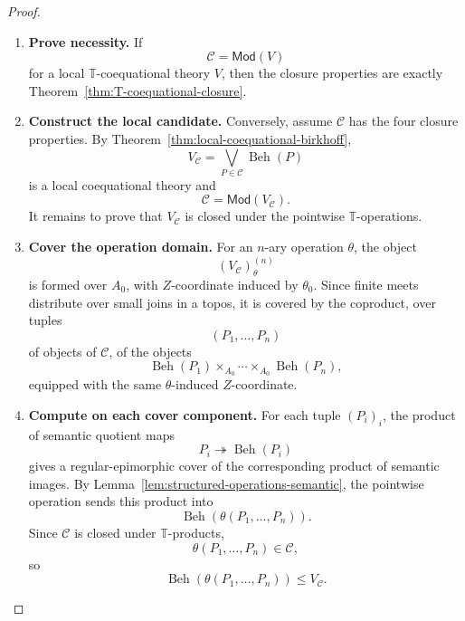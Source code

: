 \begin{proof}
    \leavevmode
    \begin{enumerate}
        \item \textbf{Prove necessity.}
        If
        \[
            \mathcal C=\mathsf{Mod}(V)
        \]
        for a local \(\mathbb T\)-coequational theory \(V\), then the closure
        properties are exactly Theorem~\ref{thm:T-coequational-closure}.

        \item \textbf{Construct the local candidate.}
        Conversely, assume \(\mathcal C\) has the four closure properties. By
        Theorem~\ref{thm:local-coequational-birkhoff},
        \[
            V_{\mathcal C}
            =
            \bigvee_{P\in\mathcal C}\operatorname{Beh}(P)
        \]
        is a local coequational theory and
        \[
            \mathcal C=\mathsf{Mod}(V_{\mathcal C}).
        \]
        It remains to prove that \(V_{\mathcal C}\) is closed under the
        pointwise \(\mathbb T\)-operations.

        \item \textbf{Cover the operation domain.}
        For an \(n\)-ary operation \(\theta\), the object
        \[
            (V_{\mathcal C})^{(n)}_\theta
        \]
        is formed over \(A_0\), with \(Z\)-coordinate induced by \(\theta_0\).
        Since finite meets distribute over small joins in a topos, it is
        covered by the coproduct, over tuples
        \[
            (P_1,\dots,P_n)
        \]
        of objects of \(\mathcal C\), of the objects
        \[
            \operatorname{Beh}(P_1)
            \times_{A_0}\cdots\times_{A_0}
            \operatorname{Beh}(P_n),
        \]
        equipped with the same \(\theta\)-induced \(Z\)-coordinate.

        \item \textbf{Compute on each cover component.}
        For each tuple \((P_i)_i\), the product of semantic quotient maps
        \[
            P_i\twoheadrightarrow\operatorname{Beh}(P_i)
        \]
        gives a regular-epimorphic cover of the corresponding product of
        semantic images. By Lemma~\ref{lem:structured-operations-semantic}, the
        pointwise operation sends this product into
        \[
            \operatorname{Beh}(\theta(P_1,\dots,P_n)).
        \]
        Since \(\mathcal C\) is closed under \(\mathbb T\)-products,
        \[
            \theta(P_1,\dots,P_n)\in\mathcal C,
        \]
        so
        \[
            \operatorname{Beh}(\theta(P_1,\dots,P_n))
            \leq
            V_{\mathcal C}.
        \]


\end{enumerate}
\end{proof}

